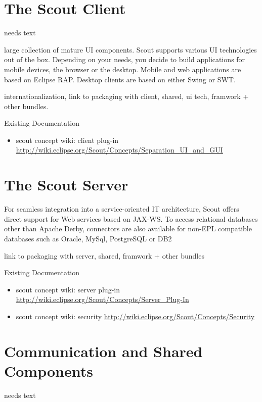 \documentclass[a4paper,10pt,twoside]{book}
\begin{document}
\section{The Scout Client}
needs text

 large collection of mature UI components.
 Scout supports various UI technologies out of the box. 
 Depending on your needs, you decide to build applications for
mobile devices, the browser or the desktop. Mobile and
web applications are based on Eclipse RAP. Desktop clients
are based on either Swing or SWT.

internationalization, link to packaging with client, shared, ui tech, framwork + other bundles. 


\noindent Existing Documentation
\begin{itemize}
  \item scout concept wiki: client plug-in \url{http://wiki.eclipse.org/Scout/Concepts/Separation_UI_and_GUI}
\end{itemize}

\section{The Scout Server}

For seamless integration into a service-oriented IT architecture, Scout offers direct support for Web services based on
JAX-WS. To access relational databases other than Apache
Derby, connectors are also available for non-EPL compatible databases such as Oracle, MySql, PostgreSQL or DB2

link to packaging with server, shared, framwork + other bundles

\noindent Existing Documentation
\begin{itemize}
  \item scout concept wiki: server plug-in \url{http://wiki.eclipse.org/Scout/Concepts/Server_Plug-In}
  \item scout concept wiki: security \url{http://wiki.eclipse.org/Scout/Concepts/Security}
\end{itemize}

\section{Communication and Shared Components}
needs text
\end{document}
